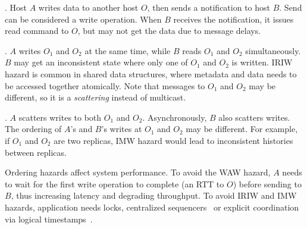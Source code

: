 .
Host $A$ writes data to another host $O$, then sends a notification to host $B$. Send can be considered a write operation.
When $B$ receives the notification, it issues read command to $O$, but may not get the data due to message delays.


.
$A$ writes $O_1$ and $O_2$ at the same time, while $B$ reads $O_1$ and $O_2$ simultaneously. $B$ may get an inconsistent state where only one of $O_1$ and $O_2$ is written. IRIW hazard is common in shared data structures, where metadata and data needs to be accessed together atomically. Note that messages to $O_1$ and $O_2$ may be different, so it is a \textit{scattering} instead of multicast.

.
$A$ scatters writes to both $O_1$ and $O_2$. Asynchronously, $B$ also scatters writes. The ordering of $A$'s and $B$'s writes at $O_1$ and $O_2$ may be different. For example, if $O_1$ and $O_2$ are two replicas, IMW hazard would lead to inconsistent histories between replicas. %

Ordering hazards affect system performance. To avoid the WAW hazard, $A$ needs to wait for the first write operation to complete (an RTT to $O$) before sending to $B$, thus increasing latency and degrading throughput. To avoid IRIW and IMW hazards, application needs locks, centralized sequencers~\cite{kaminsky2016design} or explicit coordination via logical timestamps~\cite{lamport1978time}.



